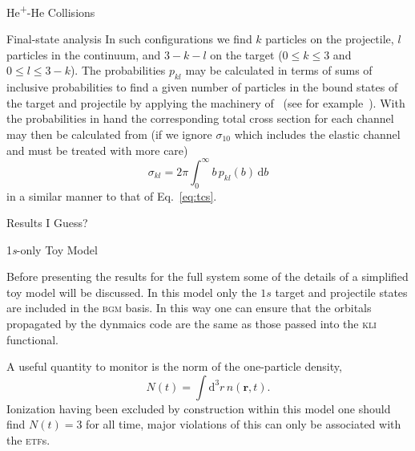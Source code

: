 \documentclass[letterpaper, 11 pt]{report}
\begin{document}
\begin{chapter}{\texorpdfstring{He\textsuperscript{+}}{He+}-He Collisions \label{chap:hephe}}
\begin{subsection}{Final-state analysis \label{sec:hephe-det}}
      In such configurations we find $k$ particles on the projectile, $l$ particles in the continuum,
      and $3 - k - l$ on the target ($0\leq k \leq 3$ and $0 \leq l \leq 3 - k$). The probabilities
      $p_{kl}$ may be calculated in terms of sums of inclusive probabilities to find a given number of
      particles in the bound states of the target and projectile by applying the machinery
      of~\cite{inc-prob} (see for example~\cite{incEx, mitsuko12, gerald15}). With the probabilities in
      hand the corresponding total cross section for each channel may then be calculated from (if we
      ignore $\sigma_{10}$ which includes the elastic channel and must be treated with more care)
      \begin{equation} \label{eq:cross}
         \sigma_{kl} = 2 \pi \int_0^\infty b \, p_{kl}(b) \, \mathrm{d}b
      \end{equation}
      in a similar manner to that of Eq.~\eqref{eq:tcs}.

   \end{subsection}

   \begin{section}{Results I Guess? \label{sec:hephe-disc}}

      \begin{subsection}{1\textit{s}-only Toy Model \label{sec:toy}}

         Before presenting the results for the full system some of the details of a simplified toy model
         will be discussed. In this model only the $1s$ target and projectile states are included in
         the \textsc{bgm} basis. In this way one can ensure that the orbitals propagated by the dynmaics
         code are the same as those passed into the \textsc{kli} functional.

         A useful quantity to monitor is the norm of the one-particle density,
         \begin{equation}
            N(t) = \int \mathrm{d}^3 r \, n(\mathbf{r},t).
         \end{equation}
         Ionization having been excluded by construction within this model one should find $N(t) = 3$
         for all time, major violations of this can only be associated with the \textsc{etf}s.


\end{subsection}
\end{section}
\end{chapter}
\end{document}
